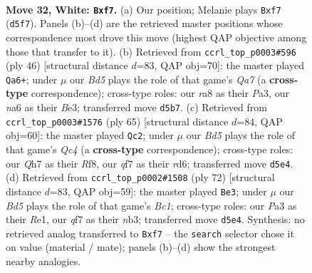 \documentclass[11pt]{article}
\begin{document}
\clearpage

\begin{figure}[p]\centering
\begin{subfigure}{0.46\textwidth}\centering
\resizebox{\linewidth}{!}{%
\newchessgame
\chessboard[
  setfen={r4k2/pp3qpQ/n4P2/2PB2B1/8/P5P1/1P3P2/2R1R1K1 w - - 1 32},
  showmover=false,
  pgfstyle=straightmove, color=movearrow, markmove={d5-f7}
]}
\caption{}
\end{subfigure}\hfill
\begin{subfigure}{0.46\textwidth}\centering
\resizebox{\linewidth}{!}{%
\newchessgame
\chessboard[
  setfen={2k4r/Q1q2prP/1pb5/4Pp2/5P2/P1p1B2R/2P5/R3K3 w Q - 0 24},
  showmover=false,
  pgfstyle=straightmove, color=movearrow, markmove={a7-a6}
]}
\caption{}
\end{subfigure}
\\[4pt]
\begin{subfigure}{0.46\textwidth}\centering
\resizebox{\linewidth}{!}{%
\newchessgame
\chessboard[
  setfen={1r3r1k/5Pp1/p2Rp2p/2q1N3/p4Q1P/1b6/5PP1/B5K1 b - - 0 33},
  showmover=false,
  pgfstyle=straightmove, color=movearrow, markmove={c5-c2}
]}
\caption{}
\end{subfigure}\hfill
\begin{subfigure}{0.46\textwidth}\centering
\resizebox{\linewidth}{!}{%
\newchessgame
\chessboard[
  setfen={4r1k1/4Pqp1/3r4/1Qp1R3/Pp3P1p/1n1p3P/6PK/2B1R3 w - - 2 37},
  showmover=false,
  pgfstyle=straightmove, color=movearrow, markmove={c1-e3}
]}
\caption{}
\end{subfigure}
\caption{\textbf{Move 32, White: \texttt{Bxf7}.} (a) Our position; Melanie plays \texttt{Bxf7} (\texttt{d5f7}). Panels (b)--(d) are the retrieved master positions whose correspondence most drove this move (highest QAP objective among those that transfer to it). (b) Retrieved from \texttt{ccrl\_top\_p0003\#596} (ply 46) [structural distance $d$=83, QAP obj=70]: the master played \texttt{Qa6+}; under $\mu$ our \emph{Bd5} plays the role of that game's \emph{Qa7} (a \textbf{cross-type} correspondence); cross-type roles: our \emph{r}a8 as their \emph{P}a3, our \emph{n}a6 as their \emph{B}e3; transferred move \texttt{d5b7}. (c) Retrieved from \texttt{ccrl\_top\_p0003\#1576} (ply 65) [structural distance $d$=84, QAP obj=60]: the master played \texttt{Qc2}; under $\mu$ our \emph{Bd5} plays the role of that game's \emph{Qc4} (a \textbf{cross-type} correspondence); cross-type roles: our \emph{Q}h7 as their \emph{R}f8, our \emph{q}f7 as their \emph{r}d6; transferred move \texttt{d5e4}. (d) Retrieved from \texttt{ccrl\_top\_p0002\#1508} (ply 72) [structural distance $d$=83, QAP obj=59]: the master played \texttt{Be3}; under $\mu$ our \emph{Bd5} plays the role of that game's \emph{Bc1}; cross-type roles: our \emph{P}a3 as their \emph{R}e1, our \emph{q}f7 as their \emph{n}b3; transferred move \texttt{d5e4}. Synthesis: no retrieved analog transferred to \texttt{Bxf7} -- the \texttt{search} selector chose it on value (material / mate); panels (b)--(d) show the strongest nearby analogies.}
\label{fig:thought-m62}
\end{figure}
\end{document}
